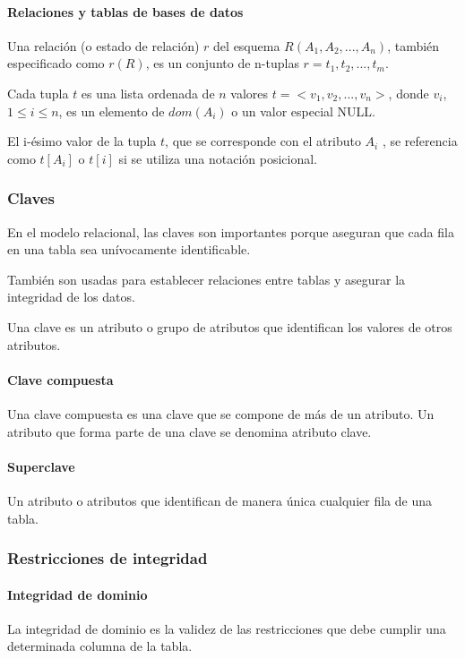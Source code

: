 \paragraph*{Relaciones y tablas de bases de datos}   
Una relación (o estado de relación) $r$ del esquema $R(A_1, A_2,..., A_n)$, también especificado como $r(R)$, es un conjunto de n-tuplas $r={t_1, t_2,..., t_m}$.


Cada tupla $t$ es una lista ordenada de $n$ valores $t=<v_1, v_2,...,v_n>$, donde $v_i$, $1 \leq i \leq n$, es un elemento de $dom(A_i)$ o un valor especial NULL.


El i-ésimo valor de la tupla $t$, que se corresponde con el atributo $A_i$ , se referencia como $t[A_i]$ o $t[i]$ si se utiliza una notación posicional.

\subsubsection{Claves}

En el modelo relacional, las claves son importantes porque aseguran que cada fila en una tabla sea unívocamente identificable. 

También son usadas para establecer relaciones entre tablas y asegurar la integridad de los datos.

Una clave es un atributo o grupo de atributos que identifican los valores de otros atributos. 

\paragraph*{Clave compuesta}
Una clave compuesta es una clave que se compone de más de un atributo. Un atributo que forma parte de una clave se denomina atributo clave.

\paragraph*{Superclave}
Un atributo o atributos que identifican de manera única cualquier fila de una tabla.

\subsubsection{Restricciones de integridad}
\paragraph*{Integridad de dominio}
La integridad de dominio es la validez de las restricciones que debe cumplir una determinada columna de la tabla.

